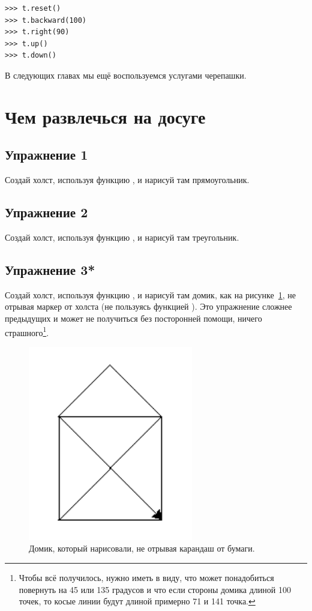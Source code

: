 \begin{listing}
\begin{verbatim}
>>> t.reset()
>>> t.backward(100)
>>> t.right(90)
>>> t.up()
>>> t.down()
\end{verbatim}
\end{listing}

В следующих главах мы ещё воспользуемся услугами черепашки.

\section{Чем развлечься на досуге}


\subsection*{Упражнение 1}
Создай холст, используя функцию , и нарисуй там прямоугольник.

\subsection*{Упражнение 2}
Создай холст, используя функцию , и нарисуй там треугольник.

\subsection*{Упражнение 3*}
Создай холст, используя функцию , и нарисуй там домик, как на рисунке \ref{fighouse}, не отрывая маркер от холста (не пользуясь функцией ). Это упражнение сложнее предыдущих и может не получиться без посторонней помощи, ничего страшного\footnote{Чтобы всё получилось, нужно иметь в виду, что может понадобиться повернуть на 45 или 135 градусов и что если стороны домика длиной 100 точек, то косые линии будут длиной примерно 71 и 141 точка.}.

\begin{figure}
\begin{center}
\includegraphics[width=72mm]{03.house.png}
\end{center}
\caption{Домик, который нарисовали, не отрывая карандаш от бумаги.}\label{fighouse}
\end{figure}

\newpage
